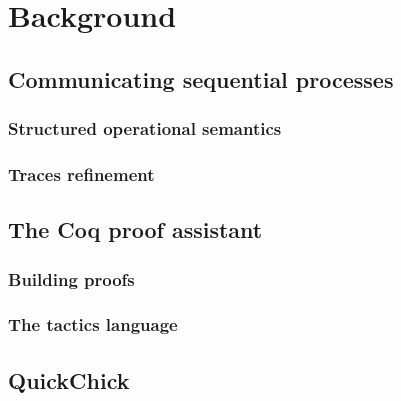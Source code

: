 \chapter{Background}

\section{Communicating sequential processes}

\subsection{Structured operational semantics}

\subsection{Traces refinement}

\section{The Coq proof assistant}

\subsection{Building proofs}

\subsection{The tactics language}

\section{QuickChick}
